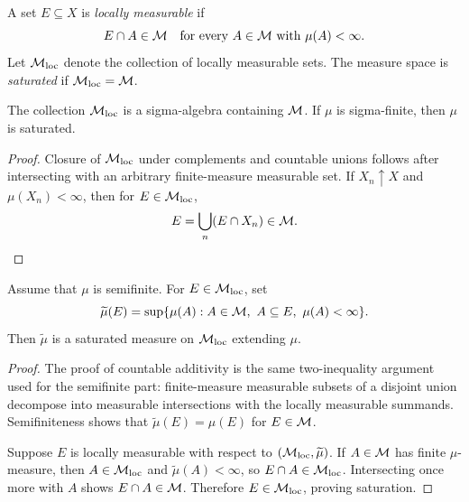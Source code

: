 \begin{de}
A set $E\subseteq X$ is \emph{locally measurable} if
\[
E\cap A\in\mathcal{M}
\quad\text{for every }A\in\mathcal{M}\text{ with }\mu(A)<\infty.
\]
Let $\mathcal{M}_{\mathrm{loc}}$ denote the collection of locally measurable sets. The measure space is \emph{saturated} if $\mathcal{M}_{\mathrm{loc}}=\mathcal{M}$.
\end{de}

\begin{prop}
The collection $\mathcal{M}_{\mathrm{loc}}$ is a sigma-algebra containing $\mathcal{M}$. If $\mu$ is sigma-finite, then $\mu$ is saturated.
\end{prop}

\begin{proof}
Closure of $\mathcal{M}_{\mathrm{loc}}$ under complements and countable unions follows after intersecting with an arbitrary finite-measure measurable set. If $X_n\uparrow X$ and $\mu(X_n)<\infty$, then for $E\in\mathcal{M}_{\mathrm{loc}}$,
\[
E=\bigcup_n(E\cap X_n)\in\mathcal{M}.
\]
\end{proof}

\begin{prop}
Assume that $\mu$ is semifinite. For $E\in\mathcal{M}_{\mathrm{loc}}$, set
\[
\widetilde\mu(E)
 =\sup\{\mu(A):A\in\mathcal{M},\ A\subseteq E,\ \mu(A)<\infty\}.
\]
Then $\widetilde\mu$ is a saturated measure on $\mathcal{M}_{\mathrm{loc}}$ extending $\mu$.
\end{prop}

\begin{proof}
The proof of countable additivity is the same two-inequality argument used for the semifinite part: finite-measure measurable subsets of a disjoint union decompose into measurable intersections with the locally measurable summands. Semifiniteness shows that $\widetilde\mu(E)=\mu(E)$ for $E\in\mathcal{M}$.

Suppose $E$ is locally measurable with respect to $(\mathcal{M}_{\mathrm{loc}},\widetilde\mu)$. If $A\in\mathcal{M}$ has finite $\mu$-measure, then $A\in\mathcal{M}_{\mathrm{loc}}$ and $\widetilde\mu(A)<\infty$, so $E\cap A\in\mathcal{M}_{\mathrm{loc}}$. Intersecting once more with $A$ shows $E\cap A\in\mathcal{M}$. Therefore $E\in\mathcal{M}_{\mathrm{loc}}$, proving saturation.
\end{proof}

